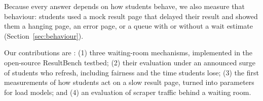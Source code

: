 Because every answer depends on how students behave, we also measure that
behaviour:  students used a mock result page that delayed their result
and showed them a hanging page, an error page, or a queue with or without a
wait estimate (Section~\ref{sec:behaviour}).

Our contributions are : (1) three waiting-room
mechanisms, implemented in the open-source ResultBench testbed; (2) their
evaluation under an announced surge of students who refresh, including
fairness and the time students lose; (3) the first measurements of how
students act on a slow result page, turned into parameters for load models;
and (4) an evaluation of scraper traffic behind a waiting room.
